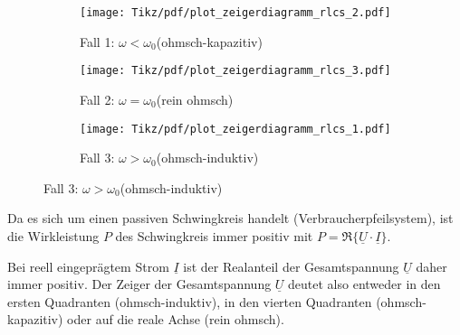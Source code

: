 \begin{frame}
{\begin{figure}[H]\centering
    \captionsetup[subfigure]{justification=centering,}%
    \begin{subfigure}{0.3\textwidth}\centering
        \texttt{[image: Tikz/pdf/plot\_zeigerdiagramm\_rlcs\_2.pdf]}
        \caption{Fall 1: $\omega < \omega_0$\newline(ohmsch-kapazitiv)}
    \end{subfigure}\hfill%
    \begin{subfigure}{0.3\textwidth}\centering
        \texttt{[image: Tikz/pdf/plot\_zeigerdiagramm\_rlcs\_3.pdf]}
        \caption{Fall 2: $\omega = \omega_0$\newline(rein ohmsch)}
    \end{subfigure}\hfill%
    \begin{subfigure}{0.3\textwidth}\centering
        \texttt{[image: Tikz/pdf/plot\_zeigerdiagramm\_rlcs\_1.pdf]}
        \caption{Fall 3: $\omega > \omega_0$\newline(ohmsch-induktiv)}
    \end{subfigure}
    \label{fig:plot:rlcs:zeigerdiagramm}
\end{figure}

Da es sich um einen passiven Schwingkreis handelt (Verbraucherpfeilsystem), 
ist die Wirkleistung $P$ des Schwingkreis immer positiv mit $P=\Re\{\underline{U}\cdot\underline{I}\}$.

Bei reell eingeprägtem Strom $\underline{I}$ ist der Realanteil der Gesamtspannung $\underline{U}$ daher immer positiv.
Der Zeiger der Gesamtspannung $\underline{U}$ deutet also entweder in den ersten Quadranten (ohmsch-induktiv), 
in den vierten Quadranten (ohmsch-kapazitiv) oder auf die reale Achse (rein ohmsch).
}
\end{frame}



